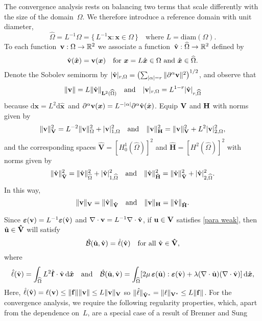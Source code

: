 \documentclass[11pt]{article}
\newcommand{\calBhat}{\hat{\mathcal{B}}}
\newcommand{\vf}{{\bf f}}
\newcommand{\vu}{{\bf u}}
\newcommand{\vv}{{\bf v}}
\newcommand{\vV}{{\bf V}}
\newcommand{\vH}{{\bf H}}
\newcommand{\vVhat}{\mathbf{\hat V}}
\newcommand{\vHhat}{\mathbf{\hat H}}
\newcommand{\bsx}{{\boldsymbol{x}}}
\numberwithin{equation}{section}
\newcommand{\veps}{{\boldsymbol{\varepsilon}}}
\newcommand{\ud}{\mathrm{d}}
\newcommand{\diam}{\mathrm{diam}}
\begin{document}
The convergence analysis rests on balancing two terms that scale differently
with the size of the domain~$\Omega$.  We therefore introduce a reference
domain with unit diameter,
\[
\widehat\Omega=L^{-1}\Omega=\{\,L^{-1}\bsx:\bsx\in\Omega\,\}
\quad\text{where $L=\diam(\Omega)$.}
\]
To each function~$\vv:\Omega\to\mathbb{R}^2$ we associate a
function~$\hat\vv:\widehat\Omega\to\mathbb{R}^2$ defined by
\[
\hat\vv(\hat\bsx)=\vv(\bsx)
    \quad\text{for $\bsx=L\hat\bsx\in\Omega$ and $\hat\bsx\in\widehat\Omega$.}
\]
Denote the Sobolev seminorm by $|\hat\vv|_{r,\Omega}=\bigl(\sum_{|\alpha|=r}
\|\partial^\alpha\vv\|^2\bigr)^{1/2}$, and observe that
\[
\|\vv\|=L\|\hat\vv\|_{\mathbf{L}^2(\widehat\Omega)}
\quad\text{and}\quad
|\vv|_{r,\Omega}=L^{1-r}|\hat\vv|_{r,\widehat\Omega}
\]
because $\ud\bsx=L^2\ud\hat\bsx$~and
$\partial^\alpha\vv(\bsx)=L^{-|\alpha|}\partial^\alpha\hat\vv(\hat\bsx)$.
Equip $\vV$ and $\vH$ with norms given by
\begin{equation}\label{eq: V H norms}
\|\vv\|_{\vV}^2=L^{-2}\|\vv\|_\Omega^2+|\vv|_{1,\Omega}^2
\quad\text{and}\quad
\|\vv\|_{\vH}^2=\|\vv\|_{\vV}^2+L^2|\vv|_{2,\Omega}^2,
\end{equation}
and the corresponding spaces
$\vVhat=[H^1_0(\widehat\Omega)]^2$ and $\vHhat=[H^2(\widehat\Omega)]^2$ with
norms given by
\[
\|\hat\vv\|_{\vVhat}^2=\|\hat\vv\|_{\widehat\Omega}^2
    +|\hat\vv|_{1,\widehat\Omega}^2
\quad\text{and}\quad
\|\hat\vv\|_{\vHhat}^2=\|\hat\vv\|_{\vVhat}^2
    +|\hat\vv|_{2,\widehat\Omega}^2.
\]
In this way,
\[
\|\vv\|_{\vV}=\|\hat\vv\|_{\vVhat}
\quad\text{and}\quad
\|\vv\|_{\mathbf{H}}=\|\hat\vv\|_{\vHhat}.
\]

Since $\veps(\vv)=L^{-1}\veps(\hat\vv)$ and
$\nabla\cdot\vv=L^{-1}\nabla\cdot\hat\vv$, if $\vu\in\vV$ satisfies
\eqref{para weak}, then $\hat\vu\in\vVhat$ will
satisfy
\[
\calBhat(\hat\vu,\hat\vv)=\hat\ell(\hat\vv)
\quad\text{for all $\hat\vv\in\vVhat$,}
\]
where
\[
\hat\ell(\hat\vv) = \int_{\widehat\Omega}L^2\hat\vf\cdot\hat\vv\,\ud\hat\bsx
\quad\text{and}\quad
\calBhat(\hat\vu,\hat\vv)=\int_{\widehat\Omega}
[2\mu\,\veps(\hat\vu):\veps(\hat\vv)+\lambda(\nabla\cdot\hat\vu)
    (\nabla\cdot\hat\vv)]\,\ud\hat\bsx,
\]
Here, $\hat\ell(\hat\vv)=\ell(\vv)\le\|\vf\|\|\vv\|\le L\|\vv\|_{\vV}$ so
$\|\hat\ell\|_{\vVhat^*}=\|\ell\|_{\vV^*}\le L\|\vf\|$. For the convergence
analysis, we require the following regularity properties, which, apart from the
dependence on~$L$, are a special case of a result of
Brenner and Sung~\cite[Lemma~2.2]{BrennerSung1992}
\end{document}
